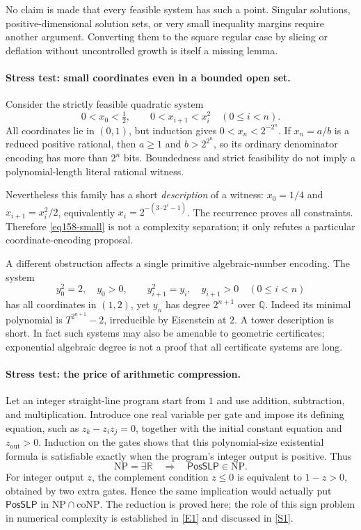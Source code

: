 \documentclass[11pt,a4paper]{article}
\newcommand{\Q}{\mathbb{Q}}
\newcommand{\R}{\mathbb{R}}
\newcommand{\sref}[2]{\hyperlink{source:#1:#2}{[S#2]}}
\newcommand{\eref}[2]{\hyperlink{extra:#1:#2}{[E#2]}}
\numberwithin{equation}{section}
\begin{document}
No claim is made that every feasible system has such a point. Singular
solutions, positive-dimensional solution sets, or very small inequality
margins require another argument. Converting them to the square regular
case by slicing or deflation without uncontrolled growth is itself a
missing lemma.

\paragraph{Stress test: small coordinates even in a bounded open set.}
Consider the strictly feasible quadratic system
\begin{equation}\label{eq158-small}
 0<x_0<\tfrac12,\qquad 0<x_{i+1}<x_i^2\quad(0\le i<n).
\end{equation}
All coordinates lie in $(0,1)$, but induction gives
$0<x_n<2^{-2^n}$. If $x_n=a/b$ is a reduced positive rational, then
$a\ge1$ and $b>2^{2^n}$, so its ordinary denominator encoding has more
than $2^n$ bits. Boundedness and strict feasibility do not imply a
polynomial-length literal rational witness.

Nevertheless this family has a short \emph{description} of a witness:
$x_0=1/4$ and $x_{i+1}=x_i^2/2$, equivalently
$x_i=2^{-(3\cdot2^i-1)}$. The recurrence proves all constraints.
Therefore \eqref{eq158-small} is not a complexity separation; it only
refutes a particular coordinate-encoding proposal.

A different obstruction affects a single primitive algebraic-number
encoding. The system
\[
 y_0^2=2,\quad y_0>0,\qquad y_{i+1}^2=y_i,\quad y_{i+1}>0
       \quad(0\le i<n)
\]
has all coordinates in $(1,2)$, yet $y_n$ has degree $2^{n+1}$ over $\Q$.
Indeed its minimal polynomial is $T^{2^{n+1}}-2$, irreducible by
Eisenstein at $2$. A tower description is short. In fact such systems may
also be amenable to geometric certificates; exponential algebraic degree
is not a proof that all certificate systems are long.

\paragraph{Stress test: the price of arithmetic compression.}
Let an integer straight-line program start from $1$ and use addition,
subtraction, and multiplication. Introduce one real variable per gate and
impose its defining equation, such as $z_k-z_i z_j=0$, together with the
initial constant equation and $z_{\mathrm{out}}>0$. Induction on the gates
shows that this polynomial-size existential formula is satisfiable exactly
when the program's integer output is positive. Thus
\begin{equation}\label{eq158-posslp}
 \mathrm{NP}=\exists\R\quad\Longrightarrow\quad
 \textsf{PosSLP}\in\mathrm{NP}.
\end{equation}
For integer output $z$, the complement condition $z\le0$ is equivalent to
$1-z>0$, obtained by two extra gates. Hence the same implication would
actually put $\textsf{PosSLP}$ in $\mathrm{NP}\cap\mathrm{coNP}$.
The reduction is proved here; the role of this sign problem in numerical
complexity is established in \eref{30006759}{1} and discussed in
\sref{30006759}{1}.
\end{document}
